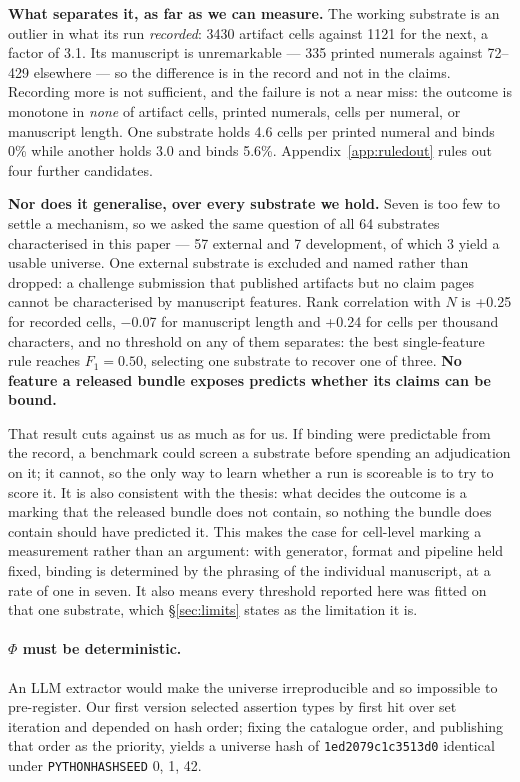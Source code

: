 \documentclass[10pt]{article}
\newcommand{\RM}[1]{{#1}}
\begin{document}
\textbf{What separates it, as far as we can measure.} The working substrate is
an outlier in what its run \emph{recorded}: \RM{3430} artifact cells against
\RM{1121} for the next, a factor of \RM{3.1}. Its manuscript is unremarkable
--- \RM{335} printed numerals against \RM{72}--\RM{429} elsewhere --- so the
difference is in the record and not in the claims. Recording more is not
sufficient, and the failure is not a near miss: the outcome is monotone in
\emph{none} of artifact cells, printed numerals, cells per numeral, or
manuscript length. One substrate holds \RM{4.6} cells per printed numeral and
binds \RM{0\%} while another holds \RM{3.0} and binds \RM{5.6\%}.
Appendix~\ref{app:ruledout} rules out four further candidates.

\textbf{Nor does it generalise, over every substrate we hold.} Seven is too few
to settle a mechanism, so we asked the same question of all \RM{64} substrates
characterised in this paper --- \RM{57} external and \RM{7} development, of
which \RM{3} yield a usable universe. One external substrate is excluded and
named rather than dropped: a challenge submission that published artifacts but
no claim pages cannot be characterised by manuscript features. Rank correlation with $N$ is
\RM{+0.25} for recorded cells, \RM{$-$0.07} for manuscript length and
\RM{+0.24} for cells per thousand characters, and no threshold on any of them
separates: the best single-feature rule reaches $F_1=\RM{0.50}$, selecting one
substrate to recover one of three. \textbf{No feature a released bundle exposes
predicts whether its claims can be bound.}

That result cuts against us as much as for us. If binding were predictable from
the record, a benchmark could screen a substrate before spending an adjudication
on it; it cannot, so the only way to learn whether a run is scoreable is to try
to score it. It is also consistent with the thesis: what decides the outcome is
a marking that the released bundle does not contain, so nothing the bundle does
contain should have predicted it. This makes the case for cell-level marking a measurement rather than an
argument: with generator, format and pipeline held fixed, binding is determined
by the phrasing of the individual manuscript, at a rate of one in seven. It also
means every threshold reported here was fitted on that one substrate, which
\S\ref{sec:limits} states as the limitation it is.

\paragraph{$\Phi$ must be deterministic.} An LLM extractor would make the
universe irreproducible and so impossible to pre-register. Our first version
selected assertion types by first hit over set iteration and depended on hash
order; fixing the catalogue order, and publishing that order as the priority,
yields a universe hash of \RM{\texttt{1ed2079c1c3513d0}} identical under
\texttt{PYTHONHASHSEED} \RM{0, 1, 42}.
\end{document}

